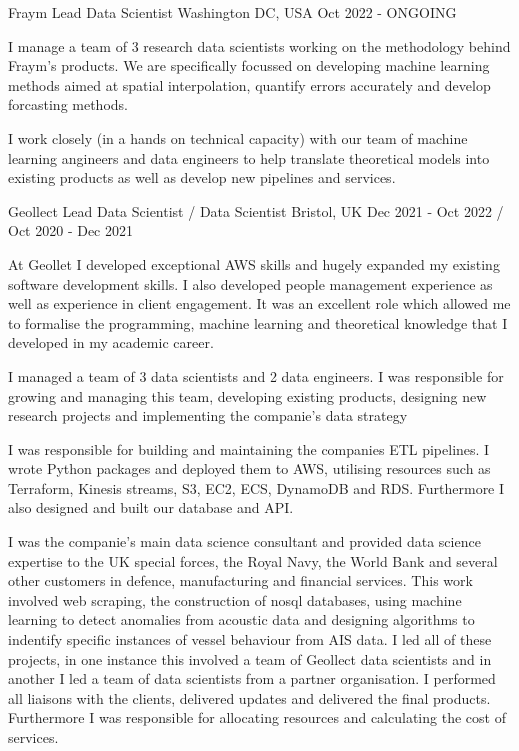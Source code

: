\begin{cventries}
  \cventry
  {Fraym}
  {Lead Data Scientist}
  {Washington DC, USA}
  {Oct  2022 - ONGOING}
  {
    \begin{cvitems}
      \item {I manage a team of 3 research data scientists working on the methodology behind Fraym's products. We are specifically focussed on developing machine learning methods aimed at spatial interpolation, quantify errors accurately and develop forcasting methods.}
      \item {I work closely (in a hands on technical capacity) with our team of machine learning angineers and data engineers to help translate theoretical models into existing products as well as develop new pipelines and services.}
    \end{cvitems}
  }
  \cventry
    {Geollect}
    {Lead Data Scientist / Data Scientist}
    {Bristol, UK}
    {Dec 2021 - Oct 2022 / Oct 2020 - Dec 2021}
    {
      \begin{cvitems}
        \item {At Geollet I developed exceptional AWS skills and hugely expanded my existing software development skills. I also developed people management experience as well as experience in client engagement. It was an excellent role which allowed me to formalise the programming, machine learning and theoretical knowledge that I developed in my academic career.}
        \item {I managed a team of 3 data scientists and 2 data engineers. I was responsible for growing and managing this team, developing existing products, designing new research projects and implementing the companie's data strategy}
        \item {I was responsible for building and maintaining the companies ETL pipelines. I wrote Python packages and deployed them to AWS, utilising resources such as Terraform, Kinesis streams, S3, EC2, ECS, DynamoDB and RDS. Furthermore I also designed and built our database and API.}
        \item {I was the companie's main data science consultant and provided data science expertise to the UK special forces, the Royal Navy, the World Bank and several other customers in defence, manufacturing and financial services. This work involved web scraping, the construction of nosql databases, using machine learning to detect anomalies from acoustic data and designing algorithms to indentify specific instances of vessel behaviour from AIS data. I led all of these projects, in one instance this involved a team of Geollect data scientists and in another I led a team of data scientists from a partner organisation. I performed all liaisons with the clients, delivered updates and delivered the final products. Furthermore I was responsible for allocating resources and calculating the cost of services.}

\end{cvitems}}
\end{cventries}
